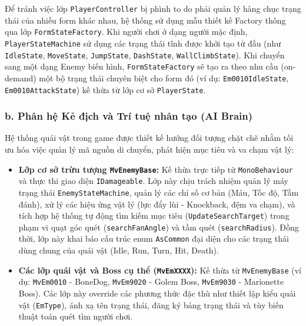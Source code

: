 \documentclass[../DoAn.tex]{subfiles}
\begin{document}
Để tránh việc lớp \texttt{PlayerController} bị phình to do phải quản lý hàng chục trạng thái của nhiều form khác nhau, hệ thống sử dụng mẫu thiết kế Factory thông qua lớp \texttt{FormStateFactory}. Khi người chơi ở dạng người mặc định, \texttt{PlayerStateMachine} sử dụng các trạng thái tĩnh được khởi tạo từ đầu (như \texttt{IdleState}, \texttt{MoveState}, \texttt{JumpState}, \texttt{DashState}, \texttt{WallClimbState}). Khi chuyển sang một dạng Enemy biến hình, \texttt{FormStateFactory} sẽ tạo ra theo nhu cầu (on-demand) một bộ trạng thái chuyên biệt cho form đó (ví dụ: \texttt{Em0010IdleState}, \texttt{Em0010AttackState}) kế thừa từ lớp cơ sở \texttt{PlayerState}.

\subsubsection{b. Phân hệ Kẻ địch và Trí tuệ nhân tạo (AI Brain)}
Hệ thống quái vật trong game được thiết kế hướng đối tượng chặt chẽ nhằm tối ưu hóa việc quản lý mã nguồn di chuyển, phát hiện mục tiêu và va chạm vật lý:
\begin{itemize}
    \item \textbf{Lớp cơ sở trừu tượng \texttt{MvEnemyBase}:} Kế thừa trực tiếp từ \texttt{MonoBehaviour} và thực thi giao diện \texttt{IDamageable}. Lớp này chịu trách nhiệm quản lý máy trạng thái \texttt{EnemyStateMachine}, quản lý các chỉ số cơ bản (Máu, Tốc độ, Tầm đánh), xử lý các hiệu ứng vật lý (lực đẩy lùi - Knockback, đệm va chạm), và tích hợp hệ thống tự động tìm kiếm mục tiêu (\texttt{UpdateSearchTarget}) trong phạm vi quạt góc quét (\texttt{searchFanAngle}) và tầm quét (\texttt{searchRadius}). Đồng thời, lớp này khai báo cấu trúc enum \texttt{AsCommon} đại diện cho các trạng thái dùng chung của quái vật (Idle, Run, Turn, Hit, Death).
    \item \textbf{Các lớp quái vật và Boss cụ thể (\texttt{MvEmXXXX}):} Kế thừa từ \texttt{MvEnemyBase} (ví dụ: \texttt{MvEm0010} - BoneDog, \texttt{MvEm9020} - Golem Boss, \texttt{MvEm9030} - Marionette Boss). Các lớp này override các phương thức đặc thù như thiết lập kiểu quái vật (\texttt{EmType}), ánh xạ tên trạng thái, đăng ký bảng trạng thái và tùy biến thuật toán quét tìm người chơi.
\end{itemize}
\end{document}
